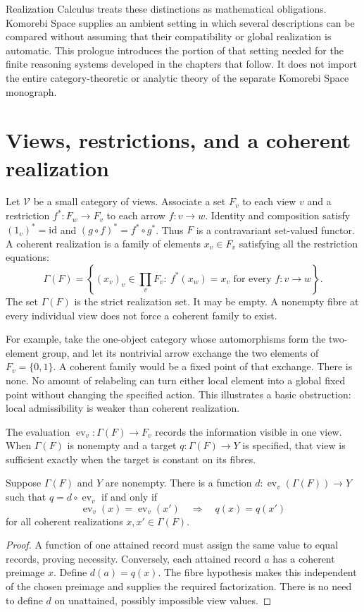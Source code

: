 \documentclass[11pt,oneside,openany]{book}
\numberwithin{equation}{section}
\begin{document}
Realization Calculus treats these distinctions as mathematical obligations. Komorebi Space supplies an ambient setting in which several descriptions can be compared without assuming that their compatibility or global realization is automatic. This prologue introduces the portion of that setting needed for the finite reasoning systems developed in the chapters that follow. It does not import the entire category-theoretic or analytic theory of the separate Komorebi Space monograph.

\section*{Views, restrictions, and a coherent realization}
Let $\mathcal V$ be a small category of views. Associate a set $F_v$ to each view $v$ and a restriction $f^*:F_w\to F_v$ to each arrow $f:v\to w$. Identity and composition satisfy $(1_v)^*=\mathrm{id}$ and $(g\circ f)^*=f^*\circ g^*$. Thus $F$ is a contravariant set-valued functor. A coherent realization is a family of elements $x_v\in F_v$ satisfying all the restriction equations:
\[
\Gamma(F)=\left\{(x_v)_v\in\prod_v F_v:\ f^*(x_w)=x_v\text{ for every }f:v\to w\right\}.
\]
The set $\Gamma(F)$ is the strict realization set. It may be empty. A nonempty fibre at every individual view does not force a coherent family to exist.

For example, take the one-object category whose automorphisms form the two-element group, and let its nontrivial arrow exchange the two elements of $F_v=\{0,1\}$. A coherent family would be a fixed point of that exchange. There is none. No amount of relabeling can turn either local element into a global fixed point without changing the specified action. This illustrates a basic obstruction: local admissibility is weaker than coherent realization.

The evaluation $\operatorname{ev}_v:\Gamma(F)\to F_v$ records the information visible in one view. When $\Gamma(F)$ is nonempty and a target $q:\Gamma(F)\to Y$ is specified, that view is sufficient exactly when the target is constant on its fibres.
\begin{Coreproposition}\label{Core:r:viewfactor}
Suppose $\Gamma(F)$ and $Y$ are nonempty. There is a function $d:\operatorname{ev}_v(\Gamma(F))\to Y$ such that $q=d\circ\operatorname{ev}_v$ if and only if
\[
\operatorname{ev}_v(x)=\operatorname{ev}_v(x')\quad\Longrightarrow\quad q(x)=q(x')
\]
for all coherent realizations $x,x'\in\Gamma(F)$.
\end{Coreproposition}
\begin{proof}
A function of one attained record must assign the same value to equal records, proving necessity. Conversely, each attained record $a$ has a coherent preimage $x$. Define $d(a)=q(x)$. The fibre hypothesis makes this independent of the chosen preimage and supplies the required factorization. There is no need to define $d$ on unattained, possibly impossible view values.
\end{proof}
\end{document}
